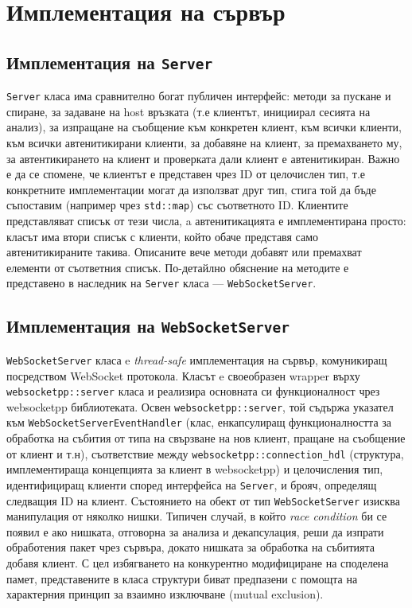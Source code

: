 \documentclass[12pt,a4paper,oneside]{book}
\begin{document}
\section{Имплементация на сървър}

\subsection{Имплементация на \texttt{Server}}

\texttt{Server} класа има сравнително богат публичен интерфейс: методи за пускане и спиране, за задаване на host връзката (т.е клиентът,
инициирал сесията на анализ), за изпращане на съобщение към конкретен клиент,
към всички клиенти, към всички автенитикирани клиенти, за добавяне на клиент, за премахването му, за
автентикирането на клиент и проверката дали клиент е автенитикиран. Важно е да
се спомене, че клиентът е представен
чрез ID от целочислен тип, т.е конкретните имплементации могат да използват
друг тип, стига той да бъде съпоставим (например чрез \texttt{std::map}) със
съответното ID. Клиентите представляват списък от тези числа, a автенитикацията е имплементирана просто: класът има втори списък
с клиенти, който обаче представя само автенитикираните такива. Описаните
вече методи добавят или премахват елементи от съответния списък. По-детайлно
обяснение на методите е представено в наследник на \texttt{Server} класа
--- \texttt{WebSocketServer}.

\subsection{Имплементация на \texttt{WebSocketServer}}

\texttt{WebSocketServer} класа e \textit{thread-safe}
имплементация на сървър, комуникиращ посредством WebSocket протокола. Класът
e своеобразен wrapper върху \texttt{websocketpp::server} класа и реализира основната си
функционалност чрез websocketpp библиотеката. Освен \texttt{websocketpp::server}, той
съдържа указател към \texttt{WebSocketServerEventHandler} (клас, енкапсулиращ
функционалността за обработка на събития от типа на свързване на нов клиент,
пращане на съобщение от клиент и т.н), съответствие между
\texttt{websocketpp::connection\_hdl} (структура, имплементираща концепцията
за клиент в websocketpp) и целочисления тип, идентифициращ клиенти според
интерфейса на \texttt{Server}, и брояч, определящ следващия ID на
клиент. Състоянието на обект от тип \texttt{WebSocketServer} изисква манипулация от
няколко нишки. Типичен случай, в който \textit{race condition} би се появил е
ако нишката, отговорна за анализа и декапсулация, реши да изпрати обработения
пакет чрез сървъра, докато нишката за обработка на събитията добавя клиент.
С цел избягването на конкурентно модифициране на споделена памет, представените в класа структури биват
предпазени с помощта на характерния принцип за взаимно изключване (mutual
exclusion).
\end{document}
